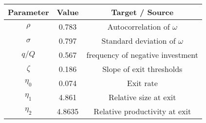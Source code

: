 {\fontshape\scdefault\selectfont 
\begin{tabular}{ccc}  
\hline\hline  
 Parameter & Value & Target / Source  \\  
 			\hline  
$\rho$ &0.783& Autocorrelation of $\omega$ \\  
 $\sigma$ &0.797& Standard deviation of $\omega$ \\  
 $q/Q$ &0.567& frequency of negative investment \\  
 $\zeta$ &0.186& Slope of exit thresholds \\  
 $\eta_0$ &0.074& Exit rate \\  
 $\eta_1$ &4.861& Relative size at exit \\  
 $\eta_2$ &4.8635& Relative productivity at exit \\  
 \hline\hline  
 \end{tabular}  
 }  
